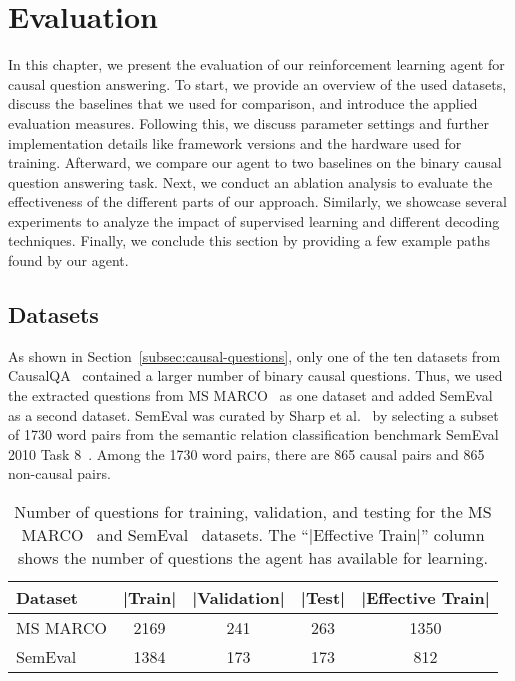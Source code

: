 %

\chapter{Evaluation}
\label{ch:evaluation}
In this chapter, we present the evaluation of our reinforcement learning
agent for causal question answering.
To start, we provide an overview of the used datasets, discuss
 the baselines that we used for comparison, and introduce the applied evaluation measures.
 Following this, we discuss parameter settings and further implementation details like 
 framework versions and the hardware used for training.
Afterward, we compare our agent to two baselines on the binary causal 
question answering task. Next, we conduct an ablation analysis 
to evaluate the effectiveness of the different parts of our approach.
Similarly, we showcase several experiments to analyze the impact of 
supervised learning and different decoding techniques.
Finally, we conclude this section by providing a few example paths found by 
our agent.


\section{Datasets}
\label{sec:datasets}
As shown in Section~\ref{subsec:causal-questions}, only one of the ten 
datasets from CausalQA~\cite{Bondarenko2022CausalQA} contained a larger number
of binary causal questions. Thus, we used the extracted questions from MS MARCO~\cite{Nguyen2016MSMARCO} as
one dataset and added SemEval~\cite{Hendrickx2010SemEval, SharpCausalQAEmbeddings2016}
as a second dataset. SemEval was curated by Sharp et al.~\cite{SharpCausalQAEmbeddings2016} by
selecting a subset of 1730 word pairs from the semantic relation classification 
benchmark SemEval 2010 Task 8~\cite{Hendrickx2010SemEval}.
Among the 1730 word pairs, there are 865 causal pairs and 865 non-causal pairs.

\begin{table}
\caption{Number of questions for training, validation, and testing for the MS MARCO~\cite{Nguyen2016MSMARCO}
and SemEval~\cite{SharpCausalQAEmbeddings2016} datasets. The ``|Effective Train|'' column shows the number of questions 
the agent has available for learning.}
\label{table-evaluation-datasets}
\centering
\begin{tabular}{lcccc} 
			\toprule
			\textbf{Dataset} & \textbf{|Train|} & \textbf{|Validation|} & \textbf{|Test|} & \textbf{|Effective Train|}\\
			\toprule
		   MS MARCO & 2169 & 241 & 263 & 1350 \\
		   SemEval & 1384 & 173 & 173 & 812 \\
			\bottomrule
\end{tabular}
\end{table}

